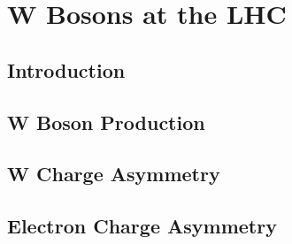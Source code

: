 
\chapter{W Bosons at the LHC}

\section{Introduction}
\section{W Boson Production}
\section{W Charge Asymmetry}
\section{Electron Charge Asymmetry}

